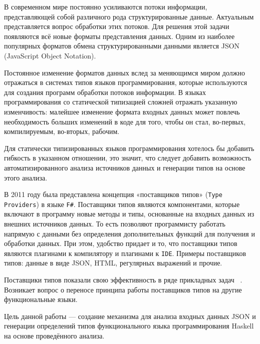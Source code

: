 


\graphicspath{ {img/} }




\Intro
В современном мире постоянно усиливаются потоки информации, представляющей собой различного рода структурированные данные. Актуальным представляется вопрос обработки этих потоков. Для решения этой задачи появляются всё новые форматы представления данных. Одним из наиболее популярных форматов обмена структурированными данными является JSON (JavaScript Object Notation).

Постоянное изменение форматов данных вслед за меняющимся миром должно отражаться в системах типов языков программирования, которые используются для создания программ обработки потоков информации. В языках программирования со статической типизацией сложней отражать указанную изменчивость: малейшее изменение формата входных данных может повлечь необходимость больших изменений в коде для того, чтобы он стал, во-первых, компилируемым, во-вторых, рабочим.

Для статически типизированных языков программирования хотелось бы добавить гибкость в указанном отношении, это значит, что следует добавить возможность автоматизированного анализа источников данных и генерации типов на основе этого анализа. 

В 2011 году была представлена концепция «поставщиков типов» (\lstinline{Type Providers}) в языке \lstinline{F#}. Поставщики типов являются компонентами, которые включают в программу новые методы и типы, основанные на входных данных из внешних источников данных. То есть позволяют программисту работать напрямую с данными без определения дополнительных функций для получения и обработки данных. При этом, удобство придает и то, что поставщики типов являются плагинами к компилятору и плагинами к \lstinline{IDE}. Примеры поставщиков типов: данные в виде JSON, HTML, регулярных выражений и прочие.

Поставщики типов показали свою эффективность в ряде прикладных задач ~\cite{typo}. Возникает вопрос о переносе принципа работы поставщиков типов на другие функциональные языки.

Цель данной работы --- создание механизма для анализа входных данных JSON и генерации определений типов функционального языка программирования Haskell на основе проведённого анализа.

